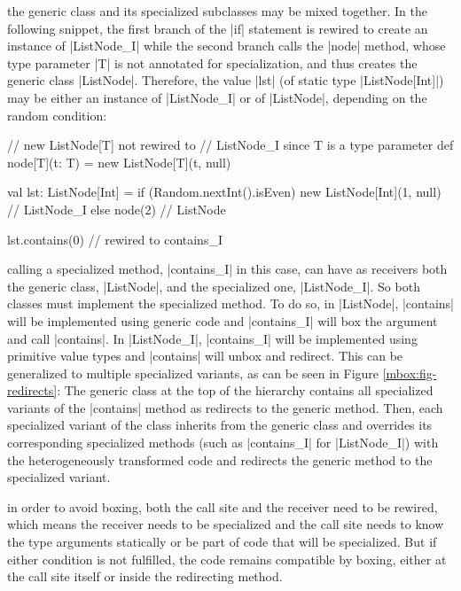  the generic class and its specialized subclasses may be mixed together. In the following snippet, the first branch of the |if| statement is rewired to create an instance of |ListNode_I| while the second branch calls the |node| method, whose type parameter |T| is not annotated for specialization, and thus creates the generic class |ListNode|. Therefore, the value |lst| (of static type |ListNode[Int]|) may be either an instance of |ListNode_I| or of |ListNode|, depending on the random condition:

\begin{lstlisting-nobreak}
 // new ListNode[T] not rewired to
 // ListNode_I since T is a type parameter
 def node[T](t: T) = new ListNode[T](t, null)

 val lst: ListNode[Int] =
   if (Random.nextInt().isEven)
     new ListNode[Int](1, null) // ListNode_I
   else
     node(2)                             // ListNode

 lst.contains(0) // rewired to contains_I
\end{lstlisting-nobreak}

 calling a specialized method, |contains_I| in this case, can have as receivers both the generic class, |ListNode|, and the specialized one, |ListNode_I|. So both classes must implement the specialized method. To do so, in |ListNode|, |contains| will be implemented using generic code and |contains_I| will box the argument and call |contains|. In |ListNode_I|, |contains_I| will be implemented using primitive value types and |contains| will unbox and redirect. This can be generalized to multiple specialized variants, as can be seen in Figure \ref{mbox:fig-redirects}: The generic class at the top of the hierarchy contains all specialized variants of the |contains| method as redirects to the generic method. Then, each specialized variant of the class inherits from the generic class and overrides its corresponding specialized methods (such as |contains_I| for |ListNode_I|) with the heterogeneously transformed code and redirects the generic method to the specialized variant.

 in order to avoid boxing, both the call site and the receiver need to be rewired, which means the receiver needs to be specialized and the call site needs to know the type arguments statically or be part of code that will be specialized. But if either condition is not fulfilled, the code remains compatible by boxing, either at the call site itself or inside the redirecting method.

